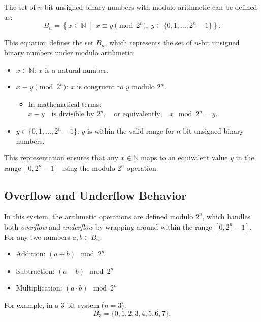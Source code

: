 The set of \( n \)-bit unsigned binary numbers with modulo arithmetic can be defined as:
\[
B_n = \left\{ x \in \mathbb{N} \; \middle| \; x \equiv y \pmod{2^n}, \; y \in \{0, 1, \dots, 2^n - 1\} \right\}.
\]

This equation defines the set \( B_n \), which represents the set of \( n \)-bit unsigned binary numbers under modulo arithmetic:
\begin{itemize}
    \item \( x \in \mathbb{N} \): \( x \) is a natural number.
    \item \( x \equiv y \pmod{2^n} \): \( x \) is congruent to \( y \) modulo \( 2^n \).
    \begin{itemize}
        \item In mathematical terms:
        \(
            x - y \quad \text{is divisible by } 2^n, \quad \text{or equivalently,} \quad x \mod 2^n = y.
            \)
    \end{itemize}
    \item \( y \in \{0, 1, \dots, 2^n - 1\} \): \( y \) is within the valid range for \( n \)-bit unsigned binary numbers.
\end{itemize}

\vspace{\baselineskip}\par
This representation ensures that any \( x \in \mathbb{N} \) maps to an equivalent value \( y \) in the range \( [0, 2^n - 1] \) using the modulo \( 2^n \) operation.

\subsection{Overflow and Underflow Behavior}
In this system, the arithmetic operations are defined modulo \( 2^n \), which handles both \textit{overflow} and \textit{underflow} by wrapping around within the range \( [0, 2^n - 1] \). For any two numbers \( a, b \in B_n \):
\begin{itemize}
    \item Addition: \( (a + b) \mod 2^n \)
    \item Subtraction: \( (a - b) \mod 2^n \)
    \item Multiplication: \( (a \cdot b) \mod 2^n \)
\end{itemize}

\vspace{\baselineskip}\par
For example, in a 3-bit system (\( n = 3 \)):
\[
B_3 = \{0, 1, 2, 3, 4, 5, 6, 7\}.
\]

